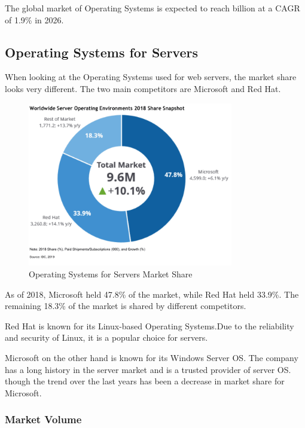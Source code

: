 The global market of Operating Systems is expected to reach  billion at a CAGR of 1.9\% in 2026.
\cite{OsMarketShare3}

\subsection{Operating Systems for Servers}

When looking at the Operating Systems used for web servers, the market share looks very different.
The two main competitors are Microsoft and Red Hat. 

\begin{figure}[H]
    \centering
    \includegraphics[width=0.8\textwidth]{figures/server-operating-system-market-share-2018.png}
    \caption{Operating Systems for Servers Market Share}
    \label{fig:Operating_Systems_for_Servers_Market_Share}
\end{figure}

As of 2018, Microsoft held 47.8\% of the market, while Red Hat held 33.9\%. 
The remaining 18.3\% of the market is shared by different competitors.   

Red Hat is known for its Linux-based Operating Systems.Due to the reliability and security of Linux, it is a popular choice for servers.

Microsoft on the other hand is known for its Windows Server OS. The company has a long history in the server market and is a trusted provider of server OS.
though the trend over the last years has been a decrease in market share for Microsoft.

\cite{ServerOsMarketShare}

\subsubsection{Market Volume}

